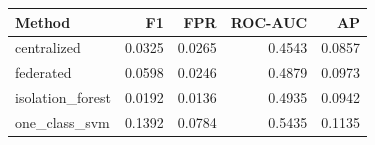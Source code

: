 \begin{tabular}{lrrrr}
Method & F1 & FPR & ROC-AUC & AP \\ \hline
centralized & 0.0325 & 0.0265 & 0.4543 & 0.0857 \\
federated & 0.0598 & 0.0246 & 0.4879 & 0.0973 \\
isolation\_forest & 0.0192 & 0.0136 & 0.4935 & 0.0942 \\
one\_class\_svm & 0.1392 & 0.0784 & 0.5435 & 0.1135 \\
\end{tabular}
